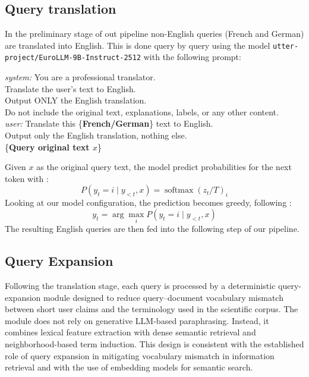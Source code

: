 \subsection{Query translation} \label{sub:querytransl}
In the preliminary stage of out pipeline non-English queries (French and German) are translated into English. This is done query by query using the model \texttt{utter-project/EuroLLM-9B-Instruct-2512} with the following prompt:
\begin{promptbox}
\small
\ttfamily
\begin{flushleft}
\textit{system:} You are a professional translator.\\
Translate the user's text to English.\\
Output ONLY the English translation.\\
Do not include the original text, explanations, labels, or any other content.\\[0.8em]

\textit{user:} Translate this \{\textbf{French/German}\} text to English.\\
Output only the English translation, nothing else.\\[0.8em]

\{\textbf{Query original text $x$}\}
\end{flushleft}
\end{promptbox}
Given $x$ as the original query text, the model predict probabilities for the next token with \cite{huggingface_transformers_generation}: 
$$P(y_t=i\mid y_{<t},x)=\operatorname{softmax}(z_t/T)_i$$
Looking at our model configuration, the prediction becomes greedy, following \cite{utter_project_eurollm_9b_instruct_2512}: $$y_t=\arg\max_i P(y_t=i\mid y_{<t},x)$$
The resulting English queries are then fed into the following step of our pipeline. 

\subsection{Query Expansion} \label{sub:query-expansion}

Following the translation stage, each query is processed by a deterministic query-expansion module designed to reduce query–document vocabulary mismatch between short user claims and the terminology used in the scientific corpus. The module does not rely on generative LLM-based paraphrasing. Instead, it combines lexical feature extraction with dense semantic retrieval and neighborhood-based term induction. This design is consistent with the established role of query expansion in mitigating vocabulary mismatch in information retrieval and with the use of embedding models for semantic search.

